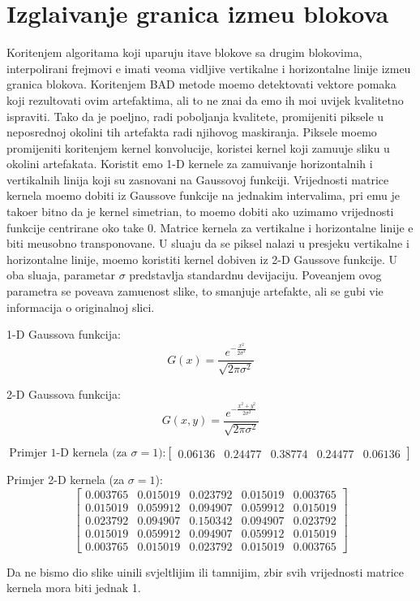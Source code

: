 \section{Izgla\dj ivanje granica izme\dj u blokova}
Kori\sh tenjem algoritama koji uparuju \ch itave blokove sa drugim blokovima, interpolirani frejmovi \cj e imati veoma vidljive vertikalne i horizontalne linije izme\dj u granica blokova. Kori\sh tenjem BAD metode mo\zh emo detektovati vektore
pomaka koji \cj rezultovati ovim artefaktima, ali to ne zna\ch i da \cj emo ih mo\cj i uvijek kvalitetno ispraviti. Tako da je po\zh eljno, radi pobolj\sh anja kvalitete, promijeniti piksele u neposrednoj okolini tih artefakta radi njihovog maskiranja.
Piksele mo\zh emo promijeniti kori\sh tenjem kernel konvolucije, koriste\cj i kernel koji zamu\cj uje sliku u okolini artefakata. Koristit \cj emo 1-D kernele za zamu\cj ivanje horizontalnih i vertikalnih linija koji su zasnovani na Gaussovoj funkciji.
Vrijednosti matrice kernela mo\zh emo dobiti iz Gaussove funkcije na jednakim intervalima, pri \ch emu je tako\dj er bitno da je kernel simetri\ch an, \sh to mo\zh emo dobiti ako uzimamo vrijednosti funkcije centrirane oko ta\ch ke 0.
Matrice kernela za vertikalne i horizontalne linije \cj e biti me\dj usobno transponovane. U slu\ch aju da se piksel nalazi u presjeku vertikalne i horizontalne linije, mo\zh emo koristiti kernel dobiven iz 2-D Gaussove funkcije. U oba slu\ch aja,
parametar $\sigma$ predstavlja standardnu devijaciju. Pove\cj anjem ovog parametra se pove\cj ava zamu\cj enost slike, \sh to smanjuje artefakte, ali se gubi vi\sh e informacija o originalnoj slici.

1-D Gaussova funkcija:
\[
G(x)=\frac{e^{-\frac{x^2}{2\sigma^2}}}{\sqrt{2\pi\sigma^2}}
\]

2-D Gaussova funkcija:
\[
G(x,y)=\frac{e^{-\frac{x^2+y^2}{2\sigma^2}}}{\sqrt{2\pi\sigma^2}}
\]

\[
\text{Primjer 1-D kernela (za $\sigma=1$):}
\begin{bmatrix}
0.06136 & 0.24477 & 0.38774 & 0.24477 & 0.06136
\end{bmatrix}
\]

Primjer 2-D kernela (za $\sigma=1$):
\[
\begin{bmatrix}
0.003765 & 0.015019 & 0.023792 & 0.015019 & 0.003765 \\
0.015019 & 0.059912 & 0.094907 & 0.059912 & 0.015019 \\
0.023792 & 0.094907 & 0.150342 & 0.094907 & 0.023792 \\
0.015019 & 0.059912 & 0.094907 & 0.059912 & 0.015019 \\
0.003765 & 0.015019 & 0.023792 & 0.015019 & 0.003765
\end{bmatrix}
\]

Da ne bismo dio slike u\ch inili svjeltlijim ili tamnijim, zbir svih vrijednosti matrice kernela mora biti jednak 1.